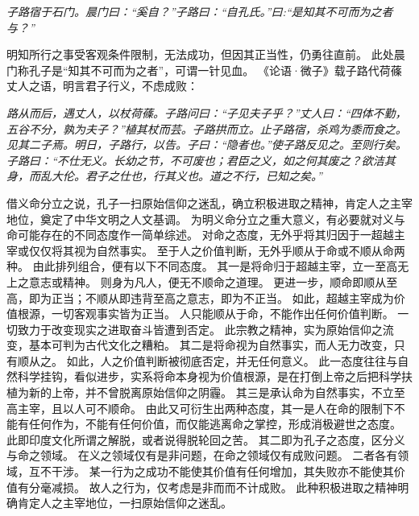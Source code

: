 \documentclass[11pt]{article}
\begin{document}
\textit{子路宿于石门。晨门曰：“奚自？”子路曰：“自孔氏。”曰:“是知其不可而为之者与？”}

明知所行之事受客观条件限制，无法成功，但因其正当性，仍勇往直前。
此处晨门称孔子是“知其不可而为之者”，可谓一针见血。
《论语·微子》载子路代荷蓧丈人之语，明言君子行义，不虑成败：

\textit{路从而后，遇丈人，以杖荷蓧。子路问曰：“子见夫子乎？”丈人曰：“四体不勤，五谷不分，孰为夫子？”植其杖而芸。子路拱而立。止子路宿，杀鸡为黍而食之。见其二子焉。明日，子路行，以告。子曰：“隐者也。”使子路反见之。至则行矣。子路曰：“不仕无义。长幼之节，不可废也；君臣之义，如之何其废之？欲洁其身，而乱大伦。君子之仕也，行其义也。道之不行，已知之矣。”}

\newline

借义命分立之说，孔子一扫原始信仰之迷乱，确立积极进取之精神，肯定人之主宰地位，奠定了中华文明之人文基调。
为明义命分立之重大意义，有必要就对义与命可能存在的不同态度作一简单综述。
对命之态度，无外乎将其归因于一超越主宰或仅仅将其视为自然事实。
至于人之价值判断，无外乎顺从于命或不顺从命两种。
由此排列组合，便有以下不同态度。
其一是将命归于超越主宰，立一至高无上之意志或精神。
则身为凡人，便无不顺命之道理。
更进一步，顺命即顺从至高，即为正当；不顺从即违背至高之意志，即为不正当。
如此，超越主宰成为价值根源，一切客观事实皆为正当。
人只能顺从于命，不能作出任何价值判断。
一切致力于改变现实之进取奋斗皆遭到否定。
此宗教之精神，实为原始信仰之流变，基本可判为古代文化之糟粕。
其二是将命视为自然事实，而人无力改变，只有顺从之。
如此，人之价值判断被彻底否定，并无任何意义。
此一态度往往与自然科学挂钩，看似进步，实系将命本身视为价值根源，是在打倒上帝之后把科学扶植为新的上帝，并不曾脱离原始信仰之阴霾。
其三是承认命为自然事实，不立至高主宰，且以人可不顺命。
由此又可衍生出两种态度，其一是人在命的限制下不能有任何作为，不能有任何价值，而仅能逃离命之掌控，形成消极避世之态度。
此即印度文化所谓之解脱，或者说得脱轮回之苦。
其二即为孔子之态度，区分义与命之领域。
在义之领域仅有是非问题，在命之领域仅有成败问题。
二者各有领域，互不干涉。
某一行为之成功不能使其价值有任何增加，其失败亦不能使其价值有分毫减损。
故人之行为，仅考虑是非而而不计成败。
此种积极进取之精神明确肯定人之主宰地位，一扫原始信仰之迷乱。
\end{document}
